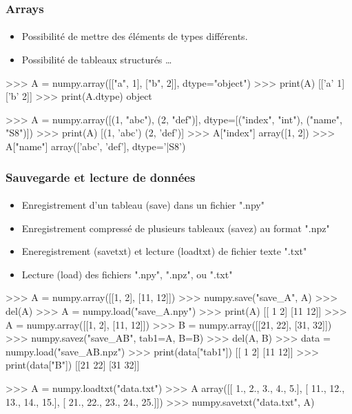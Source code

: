 \begin{frame}[fragile]
\frametitle{Arrays}
\framesubtitle{}
\begin{itemize}
 \item Possibilité de mettre des éléments de types différents.  
 \item Possibilité de tableaux structurés \dots
\end{itemize}
\begin{pythonConsole}
>>> A = numpy.array([["a", 1], ["b", 2]], dtype="object")
>>> print(A)
[['a' 1]
 ['b' 2]]
>>> print(A.dtype)
object

>>> A = numpy.array([(1, "abc"), (2, "def")], dtype=[("index", "int"), 
	("name", "S8")])
>>> print(A)
[(1, 'abc') (2, 'def')]
>>> A["index"]
array([1, 2])
>>> A["name"]
array(['abc', 'def'], 
      dtype='|S8')
\end{pythonConsole}
\end{frame}
\begin{frame}[fragile]
\frametitle{Sauvegarde et lecture de données}
\framesubtitle{}
\begin{itemize}
 \item Enregistrement d'un tableau (save) dans un fichier ".npy"
 \item Enregistrement compressé de plusieurs tableaux (savez) au format ".npz"
 \item Eneregistrement (savetxt) et lecture (loadtxt) de fichier texte ".txt"
 \item Lecture (load) des fichiers ".npy", ".npz", ou ".txt"
\end{itemize}
\begin{minipage}{6cm}
\begin{pythonConsole}
>>> A = numpy.array([[1, 2], [11, 12]])
>>> numpy.save("save_A", A)
>>> del(A)
>>> A = numpy.load("save_A.npy")
>>> print(A)
[[ 1  2]
 [11 12]]
>>> A = numpy.array([[1, 2], [11, 12]])
>>> B = numpy.array([[21, 22], [31, 32]])
>>> numpy.savez("save_AB", tab1=A, B=B)
>>> del(A, B)
>>> data = numpy.load("save_AB.npz")
>>> print(data["tab1"])
[[ 1  2]
 [11 12]]
>>> print(data["B"])
[[21 22]
 [31 32]]
\end{pythonConsole}
\end{minipage}
\begin{minipage}{5cm}
\begin{pythonConsole}
>>> A = numpy.loadtxt("data.txt")
>>> A
array([[  1.,   2.,   3.,   4.,   5.],
       [ 11.,  12.,  13.,  14.,  15.],
       [ 21.,  22.,  23.,  24.,  25.]])
>>> numpy.savetxt("data.txt", A)
\end{pythonConsole}
\end{minipage}
\end{frame}
